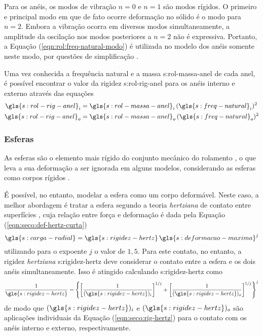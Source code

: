 \documentclass[12pt,oneside,english,brazil,lmodern,siglas,simbolos,cite=num]{ucsmonograph}
\begin{document}
	Para os anéis, os modos de vibração $n=0$ e $n=1$ são modos rígidos.
	O primeiro e principal modo em que de fato ocorre deformação no sólido é o modo para $n=2$.
	Embora a vibração ocorra em diversos modos simultaneamente, a amplitude da oscilação nos modos posteriores a $n=2$ não é expressiva.
	Portanto, a Equação (\ref{eqn:rol:freq-natural-modo}) é utilizada no modelo dos anéis somente neste modo, por questões de simplificação \cite{sassi:2007}.
	
	Uma vez conhecida a frequência natural e a massa \gls{s:rol-massa-anel} de cada anel, é possível encontrar o valor da rigidez \gls{s:rol-rig-anel} para os anéis interno e externo através das equações \cite{sassi:2007}
	\begin{align}
		\gls{s:rol-rig-anel}_i &= \gls{s:rol-massa-anel}_i\,
			(\gls{s:freq-natural}_i)^2 \label{eqn:rol:rig-anel-int}\\
		\gls{s:rol-rig-anel}_o &= \gls{s:rol-massa-anel}_o\,
			(\gls{s:freq-natural}_o)^2 \label{eqn:rol:rig-anel-ext}
	\end{align}
	
	\subsubsection{Esferas}
	As esferas são o elemento mais rígido do conjunto mecânico do rolamento \cite{sassi:2007}, o que leva a sua deformação a ser ignorada em alguns modelos, considerando as esferas como corpos rígidos \cite{mcfadden:1984,tandon:1997,sassi:2007,cong:2013}.
	
	É possível, no entanto, modelar a esfera como um corpo deformável.
	Neste caso, a melhor abordagem é tratar a esfera segundo a teoria \emph{hertziana} de contato entre superfícies \cite{patil:2010}, cuja relação entre força e deformação é dada pela Equação (\ref{eqn:seco:def-hertz-curta})
	\begin{equation*}
		\gls{s:carga-radial} = \gls{s:rigidez-hertz}\,
		\gls{s:deformacao-maxima}^j
	\end{equation*}
	utilizando para o expoente $j$ o valor de $1,5$.
	Para este contato, no entanto, a rigidez \emph{hertziana} \gls{s:rigidez-hertz} deve considerar o contato entre a esfera e os dois anéis simultaneamente.
	Isso é atingido calculando \gls{s:rigidez-hertz} como \cite{patil:2010,hamrock:1991}
	\begin{equation}
		\frac{1}{\gls{s:rigidez-hertz}} = \left\lbrace \left[
		\frac{1}{(\gls{s:rigidez-hertz})_i} \right]^{1/j} + \left[
		\frac{1}{(\gls{s:rigidez-hertz})_o} \right]^{1/j}
		\right\rbrace^j
	\end{equation}
	de modo que $ (\gls{s:rigidez-hertz})_i $ e $ (\gls{s:rigidez-hertz})_o $ são aplicações individuais da Equação (\ref{eqn:seco:rig-hertz}) para o contato com os anéis interno e externo, respectivamente.
	
\end{document}
